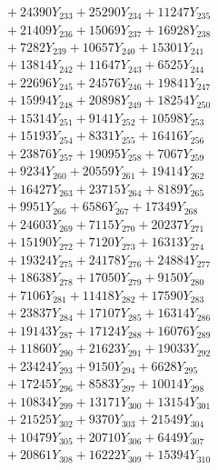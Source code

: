 \documentclass[a4paper,10pt]{article}
\begin{document}
{\begin{align}
&\;  + 24390 Y_{233} + 25290 Y_{234} + 11247 Y_{235} \\[0.3ex]
&\;  + 21409 Y_{236} + 15069 Y_{237} + 16928 Y_{238} \\[0.5ex]\allowbreak
&\;  + 7282 Y_{239} + 10657 Y_{240} + 15301 Y_{241} \\[0.3ex]
&\;  + 13814 Y_{242} + 11647 Y_{243} + 6525 Y_{244} \\[0.3ex]
&\;  + 22696 Y_{245} + 24576 Y_{246} + 19841 Y_{247} \\[0.3ex]
&\;  + 15994 Y_{248} + 20898 Y_{249} + 18254 Y_{250} \\[0.3ex]
&\;  + 15314 Y_{251} + 9141 Y_{252} + 10598 Y_{253} \\[0.3ex]
&\;  + 15193 Y_{254} + 8331 Y_{255} + 16416 Y_{256} \\[0.3ex]
&\;  + 23876 Y_{257} + 19095 Y_{258} + 7067 Y_{259} \\[0.3ex]
&\;  + 9234 Y_{260} + 20559 Y_{261} + 19414 Y_{262} \\[0.3ex]
&\;  + 16427 Y_{263} + 23715 Y_{264} + 8189 Y_{265} \\[0.3ex]
&\;  + 9951 Y_{266} + 6586 Y_{267} + 17349 Y_{268} \\[0.5ex]\allowbreak
&\;  + 24603 Y_{269} + 7115 Y_{270} + 20237 Y_{271} \\[0.3ex]
&\;  + 15190 Y_{272} + 7120 Y_{273} + 16313 Y_{274} \\[0.3ex]
&\;  + 19324 Y_{275} + 24178 Y_{276} + 24884 Y_{277} \\[0.3ex]
&\;  + 18638 Y_{278} + 17050 Y_{279} + 9150 Y_{280} \\[0.3ex]
&\;  + 7106 Y_{281} + 11418 Y_{282} + 17590 Y_{283} \\[0.3ex]
&\;  + 23837 Y_{284} + 17107 Y_{285} + 16314 Y_{286} \\[0.3ex]
&\;  + 19143 Y_{287} + 17124 Y_{288} + 16076 Y_{289} \\[0.3ex]
&\;  + 11860 Y_{290} + 21623 Y_{291} + 19033 Y_{292} \\[0.3ex]
&\;  + 23424 Y_{293} + 9150 Y_{294} + 6628 Y_{295} \\[0.3ex]
&\;  + 17245 Y_{296} + 8583 Y_{297} + 10014 Y_{298} \\[0.5ex]\allowbreak
&\;  + 10834 Y_{299} + 13171 Y_{300} + 13154 Y_{301} \\[0.3ex]
&\;  + 21525 Y_{302} + 9370 Y_{303} + 21549 Y_{304} \\[0.3ex]
&\;  + 10479 Y_{305} + 20710 Y_{306} + 6449 Y_{307} \\[0.3ex]
&\;  + 20861 Y_{308} + 16222 Y_{309} + 15394 Y_{310} \\[0.3ex]

\end{align}}
\end{document}
